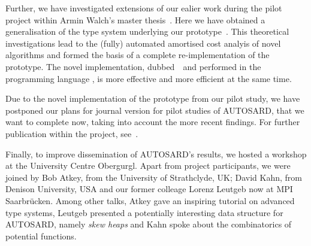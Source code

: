 \documentclass[10pt,a4paper]{article}
\begin{document}
Further, we have investigated extensions of our ealier work during the pilot project within Armin Walch's master thesis~\cite{Walch:2025}. Here we have obtained a generalisation of the type system
underlying our prototype~\atlas. This theoretical investigations lead to the (fully) automated amortised
cost analyis of novel algorithms and formed the basis of a complete re-implementation of the prototype. The novel implementation, dubbed~\newatlas\ and performed in the programming language \Haskell, is more effective and more efficient at the same time.

Due to the novel implementation of the prototype from our pilot study, we have postponed our plans for journal version for pilot studies of AUTOSARD, that we want to complete
now, taking into account the more recent findings.
%
For further publication within the project, see~\cite{AvanziniMPP24}.

Finally, to improve dissemination of AUTOSARD's results, we hosted a workshop at the University Centre Obergurgl. Apart from project participants, we were joined by Bob Atkey, from the University of Strathclyde, UK; David Kahn, from Denison University, USA and our former colleage Lorenz Leutgeb now at MPI Saarbrücken. Among other talks, Atkey gave an inspiring tutorial on advanced type systems, Leutgeb presented a potentially interesting data structure for AUTOSARD, namely \emph{skew heaps} and Kahn spoke about the combinatorics of potential functions.


\small

\end{document}
